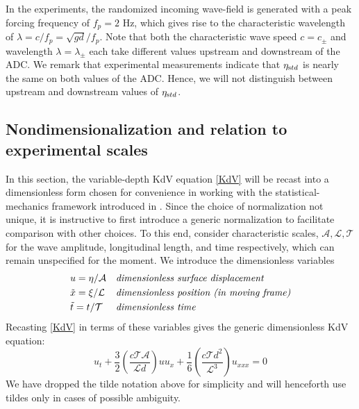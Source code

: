 \documentclass[11pt]{article}
\newcommand{\freqp}{f_p}
\newcommand{\etastd}{\eta_{\text std}}
\newcommand{\depth}{d}
\newcommand{\lam}{\lambda}
\newcommand{\lamupdn}{\lam_{\pm}}
\newcommand{\ampscale}{\mathcal{A}}
\newcommand{\lengthscale}{\mathcal{L}}
\newcommand{\timescale}{\mathcal{T}}
\begin{document}
In the experiments, the randomized incoming wave-field is generated with a peak forcing frequency of $\freqp = 2$ Hz, which gives rise to the characteristic wavelength of $\lam = c/\freqp = \sqrt{g \depth} / \freqp$. Note that both the characteristic wave speed $c = c_{\pm}$ and wavelength $\lam = \lamupdn$ each take different values upstream and downstream of the ADC. We remark that experimental measurements indicate that $\etastd$ is nearly the same on both values of the ADC. Hence, we will not distinguish between upstream and downstream values of $\etastd$.

 
\subsection{Nondimensionalization and relation to experimental scales}

In this section, the variable-depth KdV equation \eqref{KdV} will be recast into a dimensionless form chosen for convenience in working with the statistical-mechanics framework introduced in \cite{majda2019}. Since the choice of normalization not unique, it is instructive to first introduce a generic normalization to facilitate comparison with other choices. To this end, consider characteristic scales, $\ampscale, \lengthscale, \timescale$ for the wave amplitude, longitudinal length, and time respectively, which can remain unspecified for the moment. We introduce the dimensionless variables
\begin{align}
&u = \eta / \ampscale
&&\mbox{\em dimensionless surface displacement} \\
&\tilde{x} = \xi / \lengthscale
&&\mbox{\em dimensionless position (in moving frame)} \\
&\tilde{t} = t / \timescale
&&\mbox{\em dimensionless time}
\end{align}
Recasting \eqref{KdV} in terms of these variables gives the generic dimensionless KdV equation:
\begin{equation}
u_t + \frac{3}{2} \left( \frac{c \timescale \ampscale}{\lengthscale \depth} \right) u u_x 
+ \frac{1}{6} \left( \frac{c \timescale \depth^2}{\lengthscale^3} \right) u_{xxx} = 0
\end{equation}
We have dropped the tilde notation above for simplicity and will henceforth use tildes only in cases of possible ambiguity.
\end{document}
